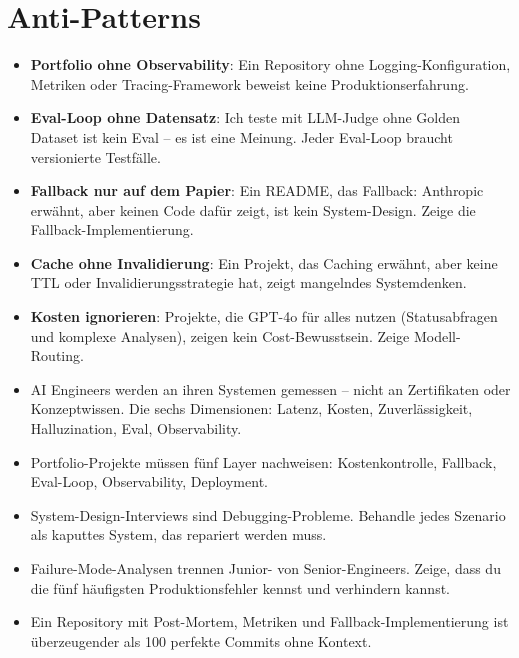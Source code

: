 \section{Anti-Patterns}

\begin{itemize}[leftmargin=*]
    \item \textbf{Portfolio ohne Observability}: Ein Repository ohne Logging-Konfiguration, Metriken oder Tracing-Framework beweist keine Produktionserfahrung.
    \item \textbf{Eval-Loop ohne Datensatz}: \glqq Ich teste mit LLM-Judge\grqq{} ohne Golden Dataset ist kein Eval -- es ist eine Meinung. Jeder Eval-Loop braucht versionierte Testfälle.
    \item \textbf{Fallback nur auf dem Papier}: Ein README, das \glqq Fallback: Anthropic\grqq{} erwähnt, aber keinen Code dafür zeigt, ist kein System-Design. Zeige die Fallback-Implementierung.
    \item \textbf{Cache ohne Invalidierung}: Ein Projekt, das Caching erwähnt, aber keine TTL oder Invalidierungsstrategie hat, zeigt mangelndes Systemdenken.
    \item \textbf{Kosten ignorieren}: Projekte, die GPT-4o für alles nutzen (Statusabfragen und komplexe Analysen), zeigen kein Cost-Bewusstsein. Zeige Modell-Routing.
\end{itemize}

\begin{zusammenfassung}
\begin{itemize}[leftmargin=*]
    \item AI Engineers werden an ihren Systemen gemessen -- nicht an Zertifikaten oder Konzeptwissen. Die sechs Dimensionen: Latenz, Kosten, Zuverlässigkeit, Halluzination, Eval, Observability.
    \item Portfolio-Projekte müssen fünf Layer nachweisen: Kostenkontrolle, Fallback, Eval-Loop, Observability, Deployment.
    \item System-Design-Interviews sind Debugging-Probleme. Behandle jedes Szenario als kaputtes System, das repariert werden muss.
    \item Failure-Mode-Analysen trennen Junior- von Senior-Engineers. Zeige, dass du die fünf häufigsten Produktionsfehler kennst und verhindern kannst.
    \item Ein Repository mit Post-Mortem, Metriken und Fallback-Implementierung ist überzeugender als 100 perfekte Commits ohne Kontext.
\end{itemize}
\end{zusammenfassung}

